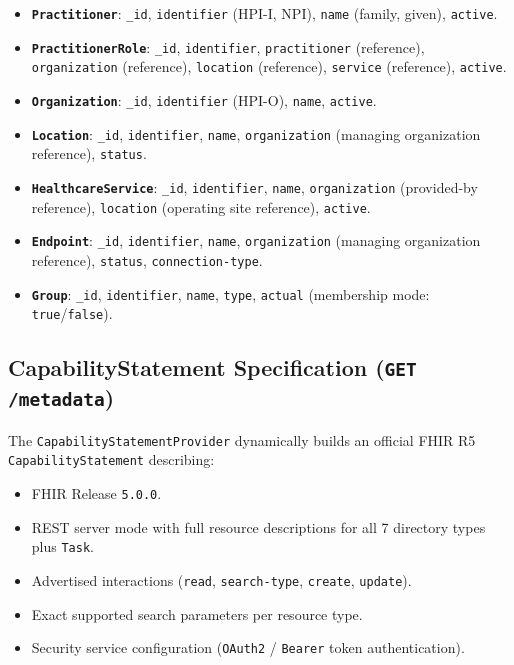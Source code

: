 \begin{itemize}
    \item \textbf{\texttt{Practitioner}}: \texttt{\_id}, \texttt{identifier} (HPI-I, NPI), \texttt{name} (family, given), \texttt{active}.
    \item \textbf{\texttt{PractitionerRole}}: \texttt{\_id}, \texttt{identifier}, \texttt{practitioner} (reference), \texttt{organization} (reference), \texttt{location} (reference), \texttt{service} (reference), \texttt{active}.
    \item \textbf{\texttt{Organization}}: \texttt{\_id}, \texttt{identifier} (HPI-O), \texttt{name}, \texttt{active}.
    \item \textbf{\texttt{Location}}: \texttt{\_id}, \texttt{identifier}, \texttt{name}, \texttt{organization} (managing organization reference), \texttt{status}.
    \item \textbf{\texttt{HealthcareService}}: \texttt{\_id}, \texttt{identifier}, \texttt{name}, \texttt{organization} (provided-by reference), \texttt{location} (operating site reference), \texttt{active}.
    \item \textbf{\texttt{Endpoint}}: \texttt{\_id}, \texttt{identifier}, \texttt{name}, \texttt{organization} (managing organization reference), \texttt{status}, \texttt{connection-type}.
    \item \textbf{\texttt{Group}}: \texttt{\_id}, \texttt{identifier}, \texttt{name}, \texttt{type}, \texttt{actual} (membership mode: \texttt{true}/\texttt{false}).
\end{itemize}

\subsection{CapabilityStatement Specification (\texttt{GET /metadata})}
The \texttt{CapabilityStatementProvider} dynamically builds an official FHIR R5 \texttt{CapabilityStatement} describing:
\begin{itemize}
    \item FHIR Release \texttt{5.0.0}.
    \item REST server mode with full resource descriptions for all 7 directory types plus \texttt{Task}.
    \item Advertised interactions (\texttt{read}, \texttt{search-type}, \texttt{create}, \texttt{update}).
    \item Exact supported search parameters per resource type.
    \item Security service configuration (\texttt{OAuth2} / \texttt{Bearer} token authentication).
\end{itemize}

